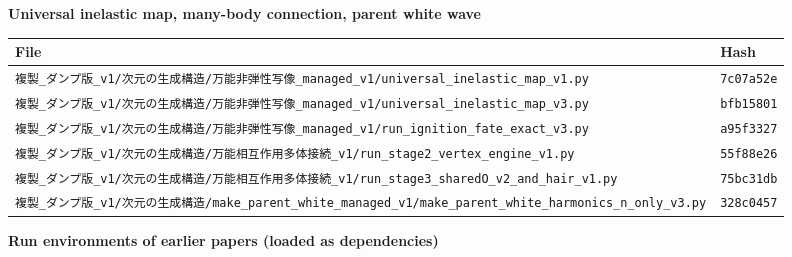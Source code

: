 \documentclass[
  10pt,
]{article}
\newcounter{none} %
\begin{document}
\textbf{Universal inelastic map, many-body connection, parent white
wave}

{\def\LTcaptype{none} %
\begin{longtable}[]{@{}
  >{\raggedright\arraybackslash}p{}
  >{\raggedright\arraybackslash}p{}@{}}
\toprule\noalign{}
\begin{minipage}[b]{\linewidth}\raggedright
File
\end{minipage} & \begin{minipage}[b]{\linewidth}\raggedright
Hash
\end{minipage} \\
\midrule\noalign{}
\endhead
\bottomrule\noalign{}
\endlastfoot
\texttt{複製\_ダンプ版\_v1/次元の生成構造/万能非弾性写像\_managed\_v1/universal\_inelastic\_map\_v1.py}
& \texttt{7c07a52e} \\
\texttt{複製\_ダンプ版\_v1/次元の生成構造/万能非弾性写像\_managed\_v1/universal\_inelastic\_map\_v3.py}
& \texttt{bfb15801} \\
\texttt{複製\_ダンプ版\_v1/次元の生成構造/万能非弾性写像\_managed\_v1/run\_ignition\_fate\_exact\_v3.py}
& \texttt{a95f3327} \\
\texttt{複製\_ダンプ版\_v1/次元の生成構造/万能相互作用多体接続\_v1/run\_stage2\_vertex\_engine\_v1.py}
& \texttt{55f88e26} \\
\texttt{複製\_ダンプ版\_v1/次元の生成構造/万能相互作用多体接続\_v1/run\_stage3\_sharedO\_v2\_and\_hair\_v1.py}
& \texttt{75bc31db} \\
\texttt{複製\_ダンプ版\_v1/次元の生成構造/make\_parent\_white\_managed\_v1/make\_parent\_white\_harmonics\_n\_only\_v3.py}
& \texttt{328c0457} \\
\end{longtable}
}

\textbf{Run environments of earlier papers (loaded as dependencies)}
\end{document}
